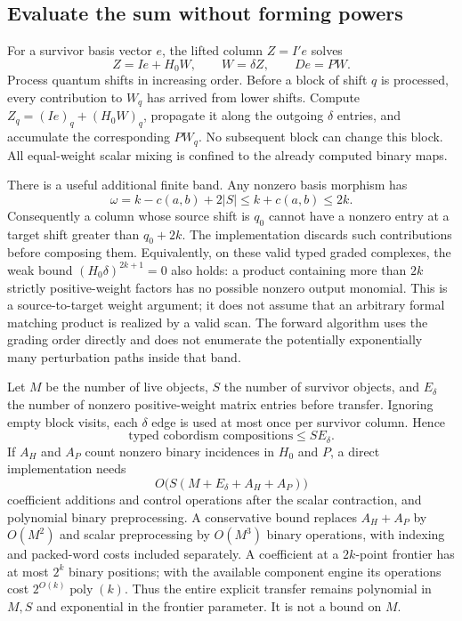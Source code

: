 \documentclass[11pt]{article}
\theoremstyle{definition}
\theoremstyle{remark}
\newcommand{\poly}{\operatorname{poly}}
\begin{document}
\subsection{Evaluate the sum without forming powers}
For a survivor basis vector $e$, the lifted column $Z=I'e$ solves
\begin{equation}
 Z=Ie+H_0W,\qquad W=\delta Z,\qquad De=PW.
 \label{eq:forward}
\end{equation}
Process quantum shifts in increasing order. Before a block of shift $q$ is processed, every contribution to $W_q$ has arrived from lower shifts. Compute $Z_q=(Ie)_q+(H_0W)_q$, propagate it along the outgoing $\delta$ entries, and accumulate the corresponding $P W_q$. No subsequent block can change this block. All equal-weight scalar mixing is confined to the already computed binary maps.

There is a useful additional finite band. Any nonzero basis morphism has
\[
 \omega=k-c(a,b)+2|S|\le k+c(a,b)\le 2k.
\]
Consequently a column whose source shift is $q_0$ cannot have a nonzero entry at a target shift greater than $q_0+2k$. The implementation discards such contributions before composing them. Equivalently, on these valid typed graded complexes, the weak bound $(H_0\delta)^{2k+1}=0$ also holds: a product containing more than $2k$ strictly positive-weight factors has no possible nonzero output monomial. This is a source-to-target weight argument; it does not assume that an arbitrary formal matching product is realized by a valid scan. The forward algorithm uses the grading order directly and does not enumerate the potentially exponentially many perturbation paths inside that band.

Let $M$ be the number of live objects, $S$ the number of survivor objects, and $E_\delta$ the number of nonzero positive-weight matrix entries before transfer. Ignoring empty block visits, each $\delta$ edge is used at most once per survivor column. Hence
\begin{equation}
 \text{typed cobordism compositions}\le S E_\delta.
 \label{eq:compositionbound}
\end{equation}
If $A_H$ and $A_P$ count nonzero binary incidences in $H_0$ and $P$, a direct implementation needs
\[
 O\bigl(S(M+E_\delta+A_H+A_P)\bigr)
\]
coefficient additions and control operations after the scalar contraction, and polynomial binary preprocessing. A conservative bound replaces $A_H+A_P$ by $O(M^2)$ and scalar preprocessing by $O(M^3)$ binary operations, with indexing and packed-word costs included separately. A coefficient at a $2k$-point frontier has at most $2^k$ binary positions; with the available component engine its operations cost $2^{O(k)}\poly(k)$. Thus the entire explicit transfer remains polynomial in $M,S$ and exponential in the frontier parameter. It is not a bound on $M$.
\end{document}
